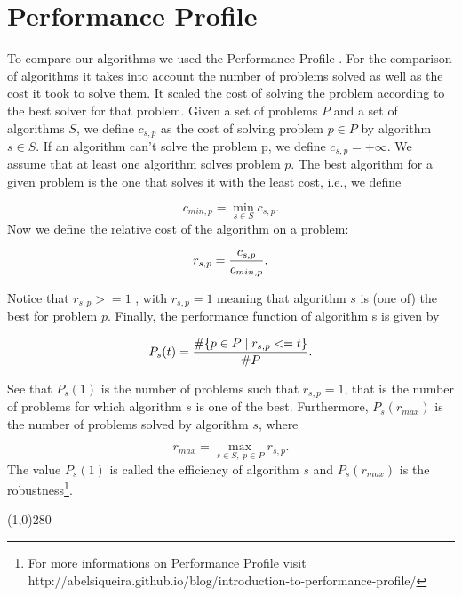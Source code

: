 \section{Performance Profile}
To compare our algorithms we used the Performance Profile \cite{dolan2002benchmarking}. For the comparison of algorithms it takes into account the number of problems solved as well as the cost it took to solve them. It scaled the cost of solving the problem according to the best solver for that problem. Given a set of problems $P$ and a set of algorithms $S$, we define $c_{s,p}$ as the cost of solving problem $p \in P$ by algorithm $s\in S$. If an algorithm can’t solve the problem p, we define $c_{s,p} = +\infty$. We assume that at least one algorithm solves problem $p$. The best algorithm for a given problem is the one that solves it with the least cost, i.e., we define

\begin{equation}
	c_{min,p} = \min_{s \in S} c_{s,p}.
\end{equation}
\noindent 
Now we define the relative cost of the algorithm on a problem:

\begin{equation}
	r_{s,p} = {c_{s,p} \over c_{min,p}}.
\end{equation}

\noindent 
Notice that $r_{s,p} >= 1$ , with $r_{s,p}=1$ meaning that algorithm $s$ is (one of) the best for problem $p$. Finally, the performance function of algorithm s is given by

\begin{equation}
	P_s(t) = {\#\{p \in P \;|\; r_{s,p} <= t \} \over \#P}.
\end{equation}

\noindent 
See that $P_s(1)$ is the number of problems such that $r_{s,p} = 1$, that is the number of problems for which algorithm $s$ is one of the best. Furthermore, $P_s(r_{max})$ is the number of problems solved by algorithm $s$, where

\begin{equation}
	r_{max} = \max_{s \in S,\; p \in P} r_{s,p}.
\end{equation}
\noindent
The value $P_s(1)$ is called the efficiency of algorithm $s$ and $P_s(r_{max})$ is the robustness\footnote{For more informations on Performance Profile visit http://abelsiqueira.github.io/blog/introduction-to-performance-profile/}.

\begin{center}
\line(1,0){280}
\end{center}

